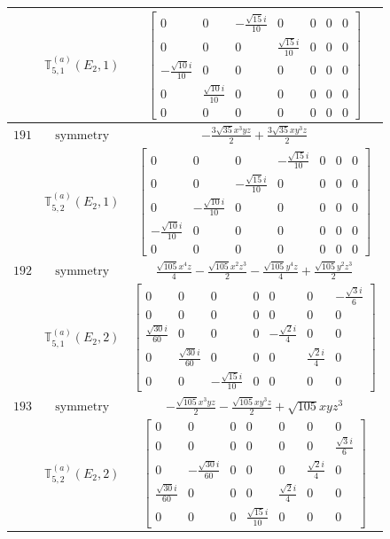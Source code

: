 \documentclass[fleqn,8pt,landscape]{jsarticle}
\begin{document}
\begin{longtable}{ccc}
$  $ & $ \mathbb{T}_{5,1}^{(a)}(E_{2},1) $ & $ \begin{bmatrix} 0 & 0 & - \frac{\sqrt{15} i}{10} & 0 & 0 & 0 & 0 \\ 0 & 0 & 0 & \frac{\sqrt{15} i}{10} & 0 & 0 & 0 \\ - \frac{\sqrt{10} i}{10} & 0 & 0 & 0 & 0 & 0 & 0 \\ 0 & \frac{\sqrt{10} i}{10} & 0 & 0 & 0 & 0 & 0 \\ 0 & 0 & 0 & 0 & 0 & 0 & 0 \end{bmatrix} $ \\ \hline
$ 191 $ & $ \text{symmetry} $ & $ - \frac{3 \sqrt{35} x^{3} y z}{2} + \frac{3 \sqrt{35} x y^{3} z}{2} $ \\
$  $ & $ \mathbb{T}_{5,2}^{(a)}(E_{2},1) $ & $ \begin{bmatrix} 0 & 0 & 0 & - \frac{\sqrt{15} i}{10} & 0 & 0 & 0 \\ 0 & 0 & - \frac{\sqrt{15} i}{10} & 0 & 0 & 0 & 0 \\ 0 & - \frac{\sqrt{10} i}{10} & 0 & 0 & 0 & 0 & 0 \\ - \frac{\sqrt{10} i}{10} & 0 & 0 & 0 & 0 & 0 & 0 \\ 0 & 0 & 0 & 0 & 0 & 0 & 0 \end{bmatrix} $ \\ \hline
$ 192 $ & $ \text{symmetry} $ & $ \frac{\sqrt{105} x^{4} z}{4} - \frac{\sqrt{105} x^{2} z^{3}}{2} - \frac{\sqrt{105} y^{4} z}{4} + \frac{\sqrt{105} y^{2} z^{3}}{2} $ \\
$  $ & $ \mathbb{T}_{5,1}^{(a)}(E_{2},2) $ & $ \begin{bmatrix} 0 & 0 & 0 & 0 & 0 & 0 & - \frac{\sqrt{3} i}{6} \\ 0 & 0 & 0 & 0 & 0 & 0 & 0 \\ \frac{\sqrt{30} i}{60} & 0 & 0 & 0 & - \frac{\sqrt{2} i}{4} & 0 & 0 \\ 0 & \frac{\sqrt{30} i}{60} & 0 & 0 & 0 & \frac{\sqrt{2} i}{4} & 0 \\ 0 & 0 & - \frac{\sqrt{15} i}{10} & 0 & 0 & 0 & 0 \end{bmatrix} $ \\ \hline
$ 193 $ & $ \text{symmetry} $ & $ - \frac{\sqrt{105} x^{3} y z}{2} - \frac{\sqrt{105} x y^{3} z}{2} + \sqrt{105} x y z^{3} $ \\
$  $ & $ \mathbb{T}_{5,2}^{(a)}(E_{2},2) $ & $ \begin{bmatrix} 0 & 0 & 0 & 0 & 0 & 0 & 0 \\ 0 & 0 & 0 & 0 & 0 & 0 & \frac{\sqrt{3} i}{6} \\ 0 & - \frac{\sqrt{30} i}{60} & 0 & 0 & 0 & \frac{\sqrt{2} i}{4} & 0 \\ \frac{\sqrt{30} i}{60} & 0 & 0 & 0 & \frac{\sqrt{2} i}{4} & 0 & 0 \\ 0 & 0 & 0 & \frac{\sqrt{15} i}{10} & 0 & 0 & 0 \end{bmatrix} $ \\ \hline

\end{longtable}
\end{document}
